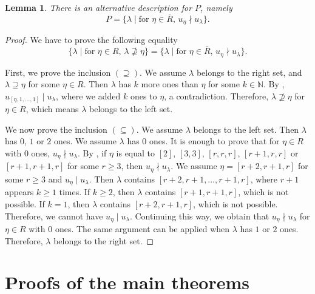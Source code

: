 \documentclass[a4paper, 12pt, reqno]{amsart}
\newtheorem{lemma}[theorem]{Lemma}
\theoremstyle{remark}
\begin{document}
\begin{lemma}
  \label{lmm:11}
  There is an alternative description for $P$, namely
  \begin{equation*}
    P = \{\lambda \mid \text{for $\eta \in \overline{R}$, $u_{\eta} \nmid u_{\lambda}$}\}.
  \end{equation*}
\end{lemma}

\begin{proof}
  We have to prove the following equality
  \begin{equation*}
    \{\lambda \mid \text{for $\eta \in R$, $\lambda \nsupseteq \eta$}\} = \{\lambda \mid \text{for $\eta \in \overline{R}$, $u_{\eta} \nmid u_{\lambda}$}\}.
  \end{equation*}

  First, we prove the inclusion $(\supseteq)$.
  We assume $\lambda$ belongs to the right set, and $\lambda \supseteq \eta$ for some $\eta \in R$.
  Then $\lambda$ has $k$ more ones than $\eta$ for some $k \in \mathbb{N}$.
  By , $u_{[\eta, 1, \dots, 1]} \mid u_{\lambda}$, where we added $k$ ones to $\eta$, a contradiction.
  Therefore, $\lambda \nsupseteq \eta$ for $\eta \in R$, which means $\lambda$ belongs to the left set.

  We now prove the inclusion $(\subseteq)$.
  We assume $\lambda$ belongs to the left set.
  Then $\lambda$ has $0$, $1$ or $2$ ones.
  We assume $\lambda$ has $0$ ones.
  It is enough to prove that for $\eta \in R$ with $0$ ones, $u_{\eta} \nmid u_{\lambda}$.
  By , if $\eta$ is equal to $[2]$, $[3, 3]$, $[r, r, r]$, $[r + 1, r, r]$ or $[r + 1, r + 1, r]$ for some $r \ge 3$, then $u_{\eta} \nmid u_{\lambda}$.
  We assume $\eta = [r + 2, r + 1, r]$ for some $r \ge 3$ and $u_{\eta} \mid u_{\lambda}$.
  Then $\lambda$ contains $[r + 2, r + 1, \dots, r + 1, r]$, where $r + 1$ appears $k \ge 1$ times.
  If $k \ge 2$, then $\lambda$ contains $[r + 1, r + 1, r]$, which is not possible.
  If $k = 1$, then $\lambda$ contains $[r + 2, r + 1, r]$, which is not possible.
  Therefore, we cannot have $u_{\eta} \mid u_{\lambda}$.
  Continuing this way, we obtain that $u_{\eta} \nmid u_{\lambda}$ for $\eta \in R$ with $0$ ones.
  The same argument can be applied when $\lambda$ has $1$ or $2$ ones.
  Therefore, $\lambda$ belongs to the right set.
\end{proof}

\section{Proofs of the main theorems}
\label{sec:proofs-main-theorems}
\end{document}
